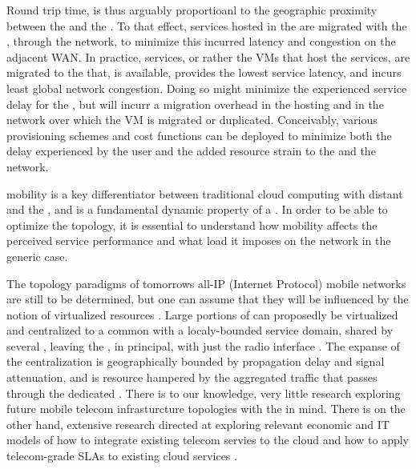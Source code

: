 Round trip time, is thus arguably proportioanl to the geographic proximity between the \ue{} and the \dc{}. To that effect, services hosted in the \xcloud{} are migrated with the \ue{}, through the network, to minimize this incurred latency and congestion on the adjacent WAN. In practice, services, or rather the VMs that host the services, are migrated to the \dc{} that, is available, provides the lowest service latency, and incurs least global network congestion. Doing so might minimize the experienced service delay for the \ue{}, but will incurr a migration overhead in the hosting \dc{} and in the network over which the VM is migrated or duplicated. Conceivably, various provisioning schemes and cost functions can be deployed to minimize both the delay experienced by the user and the added resource strain to the \dc{} and the network.

\Ue{} mobility is a key differentiator between traditional cloud computing with distant \dcs{} and the \xcloud{}, and is a fundamental dynamic property of a \xcloud{}. In order to be able to optimize the \xcloud topology, it is essential to understand how \ue{} mobility affects the perceived service performance and what load it imposes on the network in the generic case.

The topology paradigms of tomorrows all-IP (Internet Protocol) mobile networks \cite{6144211,5357099} are still to be determined, but one can assume that they will be influenced by the notion of virtualized resources \cite{baroncelli2010network, chowdhury2009network}. Large portions of \rbss{} can proposedly be virtualized and centralized to a common \dc with a localy-bounded service domain, shared by several \rbss{}, leaving the \rbss, in principal, with just the radio interface \cite{melzercloud}. The expanse of the centralization is geographically bounded by propagation delay and signal attenuation, and is resource hampered by the aggregated traffic that passes through the dedicated \dc. There is to our knowledge, very little research exploring future mobile telecom infrasturcture topologies with the \xcloud{} in mind. There is on the other hand, extensive research directed at exploring relevant economic and IT models of how to integrate existing telecom servies to the cloud and how to apply telecom-grade SLAs to existing cloud services \cite{EricssonWhitePaper,6156350, 5357099}.

